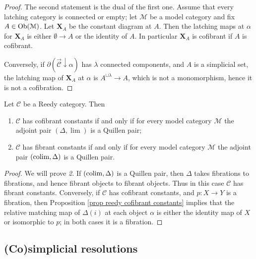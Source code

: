 \begin{refsection}
\begin{proof}
The second statement is the dual of the first one. Assume that every latching category is connected or empty; let $\mathcal M$ be a model category and fix $A \in \operatorname{Ob}(\mathcal M)$. Let $\mathbf X_A$ be the constant diagram at $A$. Then the latching maps at $\alpha$ for $\mathbf X_A$ is either $\emptyset \to A$ or the identity of $A$. In particular $\mathbf X_A$ is cofibrant if $A$ is cofibrant.

Conversely, if $\partial (\overrightarrow{\mathcal C} \downarrow \alpha)$ has $\lambda$ connected components, and $A$ is a simplicial set, the latching map of $\mathbf X_A$ at $\alpha$ is $A^{\sqcup \lambda} \to A$, which is not a monomorphism, hence it is not a cofibration.
\end{proof}

\begin{cor} \label{cor reedy fibrant constants}
Let $\mathcal C$ be a Reedy category. Then
\begin{enumerate}
\item $\mathcal C$ has cofibrant constants if and only if for every model category $\mathcal M$ the adjoint pair $(\Delta, \lim)$ is a Quillen pair;
\item $\mathcal C$ has fibrant constants if and only if for every model category $\mathcal M$ the adjoint pair $(\operatorname*{colim}, \Delta)$ is a Quillen pair.
\end{enumerate}
\end{cor}

\begin{proof}
We will prove \emph{2.} If $(\operatorname*{colim}, \Delta)$ is a Quillen pair, then $\Delta$ takes fibrations to fibrations, and hence fibrant objects to fibrant objects. Thus in this case $\mathcal C$ has fibrant constants. Conversely, if $\mathcal C$ has cofibrant constants, and $p \colon X \to Y$ is a fibration, then Proposition \ref{prop reedy cofibrant constants} implies that the relative matching map of $\Delta(i)$ at each object $\alpha$ is either the identity map of $X$ or isomorphic to $p$; in both cases it is a fibration.
\end{proof}


\subsection{(Co)simplicial resolutions} \label{cosimplicial resolutions}


\end{refsection}
